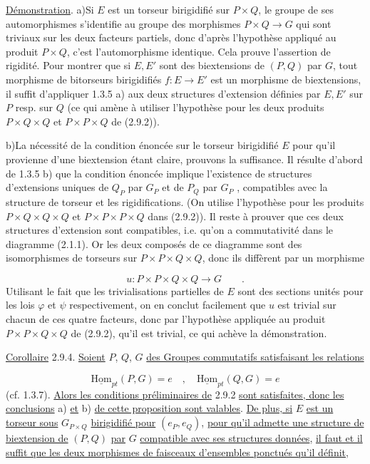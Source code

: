 \underline{Démonstration}. a)\quad Si $E$ est un torseur birigidifié sur $P\times Q$, le groupe de ses automorphismes s'identifie au groupe des morphismes $P\times Q \longrightarrow G$ qui sont triviaux sur les deux facteurs partiels, donc d'après l'hypothèse appliqué au produit $P\times Q$, c'est l'automorphisme identique. Cela prouve l'assertion de rigidité. Pour montrer que si $E,E'$ sont des biextensions de $(P,Q)$ par $G$, tout morphisme de bitorseurs birigidifiés $f : E \longrightarrow E'$ est un morphisme de biextensions, il suffit d'appliquer 1.3.5 a) aux deux structures d'extension définies par $E,E'$ sur $P$ resp. sur $Q$ (ce qui amène à utiliser l'hypothèse pour les deux produits $P\times Q\times Q$ et $P\times P\times Q$ de (2.9.2)).

b)\quad La nécessité de la condition énoncée sur le torseur birigidifié $E$ pour qu'il provienne d'une biextension étant claire, prouvons la suffisance. Il résulte d'abord de 1.3.5 b) que la condition énoncée implique l'existence de structures d'extensions uniques de $Q_P$ par $G_P$ et de $P_Q$ par $G_P$ , compatibles avec la structure de torseur et les rigidifications. (On utilise l'hypothèse pour les produits $P\times Q\times Q\times Q$ et $P\times P\times P\times Q$
dans (2.9.2)). Il reste à prouver que ces deux structures d'extension sont compatibles, i.e. qu'on a commutativité dans le diagramme (2.1.1). Or les deux composés de ce diagramme sont des isomorphismes de torseurs sur $P\times P\times Q\times Q$, donc ils diffèrent par un morphisme

\begin{equation*}
u : P\times P\times Q\times Q \longrightarrow G \qquad .
\end{equation*}
Utilisant le fait que les trivialisations partielles de $E$ sont des sections unités pour les lois $\varphi$ et $\psi$ respectivement, on en conclut facilement que $u$ est trivial sur chacun de ces quatre facteurs, donc par l'hypothèse appliquée au produit $P\times P\times Q\times Q$ de (2.9.2), qu'il est trivial, ce qui achève la démonstration.

\underline{Corollaire} 2.9.4. \underline{Soient} $P$, $Q$, $G$ \underline{des Groupes commutatifs satisfaisant les relations}

\begin{equation}\tag{2.9.4.1}
\underline{\mathrm{Hom}}_{pt}(P,G) = e \quad , \quad \underline{\mathrm{Hom}}_{pt}(Q,G) = e
\end{equation}
(cf. 1.3.7). \underline{Alors les conditions préliminaires de} 2.9.2 \underline{sont satisfaites, donc les conclusions} a) \underline{et} b) \underline{de cette proposition sont valables}. \underline{De plus, si} $E$ \underline{est un torseur sous} $G_{P\times Q}$ \underline{birigidifié pour} $(e_P,e_Q)$, \underline{pour qu'il admette une structure de biextension de} $(P,Q)$ \underline{par} $G$ \underline{compatible avec ses structures données}, \underline{il faut et il suffit que les deux morphismes de faisceaux d'ensembles ponctués qu'il définit},

